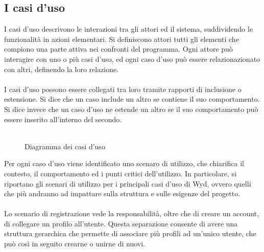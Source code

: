 \subsection{I casi d’uso}

I casi d’uso descrivono le interazioni tra gli attori ed il sistema, suddividendo le funzionalità in azioni elementari.
Si definiscono attori tutti gli elementi che compiono una parte attiva nei confronti del programma.
Ogni attore può interagire con uno o più casi d'uso,
ed ogni caso d'uso può essere relazionazionato con altri, definendo la loro relazione.\\
\\
I casi d'uso possono essere collegati tra loro tramite rapporti di inclusione o estensione.
Si dice che un caso include un altro se contiene il suo comportamento.
Si dice invece che un caso d'uso ne estende un altro se il suo comportamento può essere inserito all'interno del secondo.\\
\\

\begin{figure}[htb]
    \centering
    \caption{Diagramma dei casi d'uso}
\end{figure}
\clearpage
Per ogni caso d'uso viene identificato uno scenaro di utilizzo, che chiarifica il contesto, il comportamento ed i punti critici dell'utilizzo.
In particolare, si riportano gli scenari di utilizzo per i principali casi d'uso di Wyd, ovvero quelli
che più andranno ad impattare sulla struttura e sulle esigenze del progetto.\\
\\
Lo scenario di registrazione vede la responsabilità, oltre che di creare un account, di collegare un profilo all'utente.
Questa separazione consente di avere una struttura gerarchica che permette di associare più profili ad un'unico utente, che può così in seguito crearne o unirne di nuovi.\\

